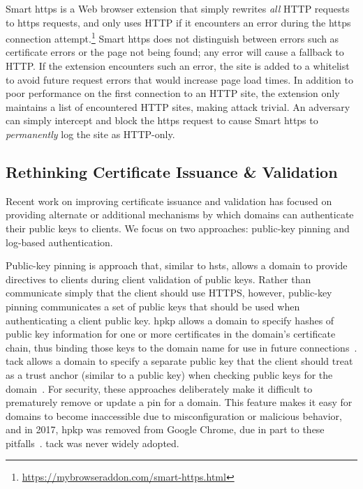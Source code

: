 Smart \ac{https} is a Web browser extension that simply rewrites \emph{all} HTTP
requests to \ac{https} requests, and only uses HTTP if it encounters an error
during the \ac{https} connection
attempt.\footnote{\url{https://mybrowseraddon.com/smart-https.html}} Smart
\ac{https} does not distinguish between errors such as certificate errors or the
page not being found; any error will cause a fallback to HTTP. If the extension
encounters such an error, the site is added to a whitelist to avoid future
request errors that would increase page load times. In addition
to poor performance on the first connection to an HTTP site, the extension only
maintains a list of encountered HTTP sites, making  attack trivial. An
adversary can simply intercept and block the \ac{https} request to cause Smart
\ac{https} to \emph{permanently} log the site as HTTP-only.

\subsection{Rethinking Certificate Issuance \& Validation}

Recent work on improving certificate issuance and validation has focused on
providing alternate or additional mechanisms by which domains can authenticate
their public keys to clients. We focus on two approaches: public-key pinning and
log-based authentication.

Public-key pinning is  approach that, similar to \ac{hsts}, allows a
domain to provide directives to clients during client validation of public keys.
Rather than communicate simply that the client should use HTTPS, however,
public-key pinning communicates a set of public keys that should be used when
authenticating a client public key. \ac{hpkp} allows a domain to specify hashes
of public key information for one or more certificates in the domain's
certificate chain, thus binding those keys to the domain name for use in future
connections~\cite{rfc7469}. \ac{tack} allows a domain to specify a separate
public key that the client should treat as a trust anchor (similar to a  public key) 
when checking public keys for the domain~\cite{marlinspike2013trust}. For security,
these approaches deliberately make it difficult to prematurely remove or update
a pin for a domain. This feature makes it easy for domains to become
inaccessible due to misconfiguration or malicious behavior, and in 2017,
\ac{hpkp} was removed from Google Chrome, due in part to these
pitfalls~\cite{palmer2017intent}. \ac{tack} was never widely adopted.

